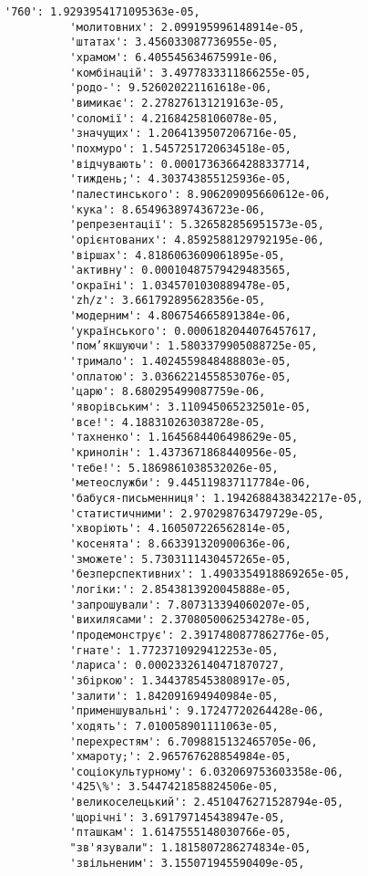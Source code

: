 \documentclass[11pt]{article}
\begin{document}
\begin{Verbatim}[commandchars=\\\{\}]
          '760': 1.9293954171095363e-05,
          'молитовних': 2.099195996148914e-05,
          'штатах': 3.456033087736955e-05,
          'храмом': 6.405545634675991e-06,
          'комбінацій': 3.4977833311866255e-05,
          'родо-': 9.526020221161618e-06,
          'вимикає': 2.278276131219163e-05,
          'соломії': 4.21684258106078e-05,
          'значущих': 1.2064139507206716e-05,
          'похмуро': 1.5457251720634518e-05,
          'відчувають': 0.00017363664288337714,
          'тиждень;': 4.303743855125936e-05,
          'палестинського': 8.906209095660612e-06,
          'кука': 8.654963897436723e-06,
          'репрезентації': 5.326582856951573e-05,
          'орієнтованих': 4.8592588129792195e-06,
          'віршах': 4.8186063609061895e-05,
          'активну': 0.00010487579429483565,
          'окраїні': 1.0345701030889478e-05,
          'zh/z': 3.661792895628356e-05,
          'модерним': 4.806754665891384e-06,
          'українського': 0.0006182044076457617,
          'пом’якшуючи': 1.5803379905088725e-05,
          'тримало': 1.4024559848488803e-05,
          'оплатою': 3.0366221455853076e-05,
          'царю': 8.680295499087759e-06,
          'яворівським': 3.110945065232501e-05,
          'все!': 4.188310263038728e-05,
          'тахненко': 1.1645684406498629e-05,
          'кринолін': 1.4373671868440956e-05,
          'тебе!': 5.1869861038532026e-05,
          'метеослужби': 9.445119837117784e-06,
          'бабуся-письменниця': 1.1942688438342217e-05,
          'статистичними': 2.970298763479729e-05,
          'хворіють': 4.160507226562814e-05,
          'косенята': 8.663391320900636e-06,
          'зможете': 5.7303111430457265e-05,
          'безперспективних': 1.4903354918869265e-05,
          'логіки:': 2.8543813920045888e-05,
          'запрошували': 7.807313394060207e-05,
          'вихилясами': 2.3708050062534278e-05,
          'продемонструє': 2.3917480877862776e-05,
          'гнате': 1.7723710929412253e-05,
          'лариса': 0.00023326140471870727,
          'збіркою': 1.3443785453808917e-05,
          'залити': 1.842091694940984e-05,
          'применшувальні': 9.17247720264428e-06,
          'ходять': 7.010058901111063e-05,
          'перехрестям': 6.7098815132465705e-06,
          'хмароту;': 2.965767628854984e-05,
          'соціокультурному': 6.032069753603358e-06,
          '425\%': 3.5447421858824506e-05,
          'великоселецький': 2.4510476271528794e-05,
          'щорічні': 3.691797145438947e-05,
          'пташкам': 1.6147555148030766e-05,
          "зв'язували": 1.1815807286274834e-05,
          'звільненим': 3.155071945590409e-05,

\end{Verbatim}
\end{document}
